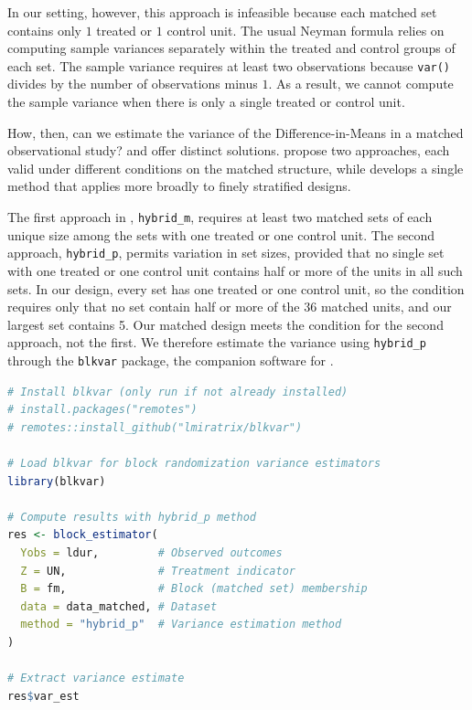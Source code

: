 \documentclass[twoside,11pt]{article}
\begin{document}
In our setting, however, this approach is infeasible because each
matched set contains only \(1\) treated or \(1\) control unit. The usual
Neyman formula relies on computing sample variances separately within
the treated and control groups of each set. The sample variance requires
at least two observations because \texttt{var()} divides by the number
of observations minus \(1\). As a result, we cannot compute the sample
variance when there is only a single treated or control unit.

How, then, can we estimate the variance of the Difference-in-Means in a
matched observational study? \citet{pashleymiratrix2021} and
\citet{fogarty2018} offer distinct solutions.
\citet{pashleymiratrix2021} propose two approaches, each valid under
different conditions on the matched structure, while \citet{fogarty2018}
develops a single method that applies more broadly to finely stratified
designs.

The first approach in \citet{pashleymiratrix2021}, \texttt{hybrid\_m},
requires at least two matched sets of each unique size among the sets with one treated or one control unit.
The second approach, \texttt{hybrid\_p}, permits variation in set sizes,
provided that no single set with one treated or one control unit
contains half or more of the units in all such sets. In our design,
every set has one treated or one control unit, so the condition requires
only that no set contain half or more of the 36 matched units, and our
largest set contains 5.
Our matched design meets the condition for the second approach, not the
first. We therefore estimate the variance using \texttt{hybrid\_p}
through the \texttt{blkvar} package, the companion software for
\citet{pashleymiratrix2021}.



\begin{lstlisting}[language=R]
# Install blkvar (only run if not already installed)
# install.packages("remotes")
# remotes::install_github("lmiratrix/blkvar")

# Load blkvar for block randomization variance estimators
library(blkvar)

# Compute results with hybrid_p method
res <- block_estimator(
  Yobs = ldur,         # Observed outcomes
  Z = UN,              # Treatment indicator
  B = fm,              # Block (matched set) membership
  data = data_matched, # Dataset
  method = "hybrid_p"  # Variance estimation method
)

# Extract variance estimate
res$var_est
\end{lstlisting}
\end{document}
